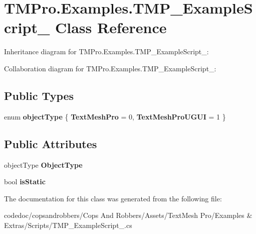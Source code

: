 \hypertarget{classTMPro_1_1Examples_1_1TMP__ExampleScript__01}{}\section{T\+M\+Pro.\+Examples.\+T\+M\+P\+\_\+\+Example\+Script\+\_ Class Reference}
\label{classTMPro_1_1Examples_1_1TMP__ExampleScript__01}


Inheritance diagram for T\+M\+Pro.\+Examples.\+T\+M\+P\+\_\+\+Example\+Script\+\_\+:


Collaboration diagram for T\+M\+Pro.\+Examples.\+T\+M\+P\+\_\+\+Example\+Script\+\_\+:
\subsection*{Public Types}
\begin{DoxyCompactItemize}
\item 
\mbox{\label{classTMPro_1_1Examples_1_1TMP__ExampleScript__01_a7581fa07718f773bf9347019769d2c80}} 
enum {\bfseries object\+Type} \{ {\bfseries Text\+Mesh\+Pro} = 0, 
{\bfseries Text\+Mesh\+Pro\+U\+G\+UI} = 1
 \}
\end{DoxyCompactItemize}
\subsection*{Public Attributes}
\begin{DoxyCompactItemize}
\item 
\mbox{\label{classTMPro_1_1Examples_1_1TMP__ExampleScript__01_aeb3d9e7c797f07f254f4f280467b7cee}} 
object\+Type {\bfseries Object\+Type}
\item 
\mbox{\label{classTMPro_1_1Examples_1_1TMP__ExampleScript__01_a5d554a45b55df66f623b13ccb74d3455}} 
bool {\bfseries is\+Static}
\end{DoxyCompactItemize}


The documentation for this class was generated from the following file\+:\begin{DoxyCompactItemize}
\item 
codedoc/copsandrobbers/\+Cops And Robbers/\+Assets/\+Text\+Mesh Pro/\+Examples \& Extras/\+Scripts/T\+M\+P\+\_\+\+Example\+Script\+\_.\+cs\end{DoxyCompactItemize}
